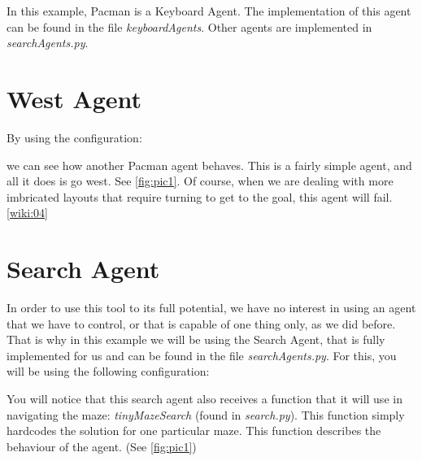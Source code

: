 \documentclass[a4paper,12pt]{report}
\begin{document}
In this example, Pacman is a Keyboard Agent. The implementation of this agent can be found in the file \textit{keyboardAgents}. Other agents are implemented in \textit{searchAgents.py}.

\section{West Agent}
By using the configuration:

\vspace{0.3cm}
\vspace{0.3cm}

we can see how another Pacman agent behaves. This is a fairly simple agent, and all it does is go west. See \ref{fig:pic1}. 
Of course, when we are dealing with more imbricated layouts that require turning to get to the goal, this agent will fail.\ref{wiki:04}

\section{Search Agent}
In order to use this tool to its full potential, we have no interest in using an agent that we have to control, or that is capable of one thing only, as we did before. That is why in this example we will be using the Search Agent, that is fully implemented for us and can be found in the file \textit{searchAgents.py}. For this, you will be using the following configuration:

\vspace{0.3cm}
\vspace{0.3cm}

You will notice that this search agent also receives a function that it will use in navigating the maze: \textit{tinyMazeSearch} (found in \textit{search.py}). This function simply hardcodes the solution for one particular maze. This function describes the behaviour of the agent. (See \ref{fig:pic1})
\end{document}
